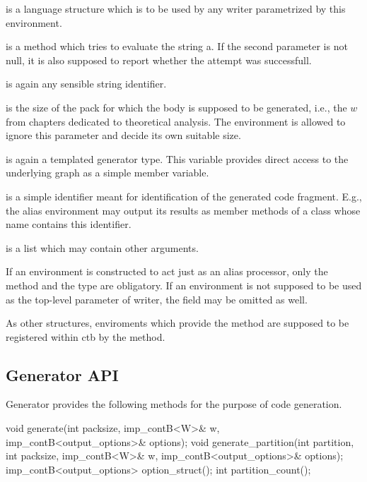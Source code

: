 \begin{description}
\item {} is a language structure which is to be used by any writer parametrized by this environment.
\item {} is a method which tries to evaluate the string a. If the second parameter is not null, it is also supposed to report whether the attempt was successfull.
\item {} is again any sensible string identifier.
\item {}
  \begin{description}
    \item {} is the size of the pack for which the body is supposed to be generated, i.e., the $w$ from chapters dedicated to theoretical analysis. The environment is allowed to ignore this parameter and decide its own suitable size.
    \item {} is again a templated generator type. This variable provides direct access to the underlying graph as a simple member variable.
    \item {} is a simple identifier meant for identification of the generated code fragment. E.g., the alias environment may output its results as member methods of a class whose name contains this identifier.
    \item {} is a list which may contain other arguments.
  \end{description}
\end{description}

If an environment is constructed to act just as an alias processor, only the  method and the  type are obligatory. If an environment is not supposed to be used as the top-level parameter of writer, the  field may be omitted as well.

As other structures, enviroments which provide the  method are supposed to be registered within ctb by the  method.

\subsection{Generator API}

Generator provides the following methods for the purpose of code generation. 

\begin{code}
void generate(int packsize, 
    imp_contB<W>& w, imp_contB<output_options>& options); 
void generate_partition(int partition, int packsize, 
    imp_contB<W>& w, imp_contB<output_options>& options);
imp_contB<output_options> option_struct();
int partition_count();
\end{code}


